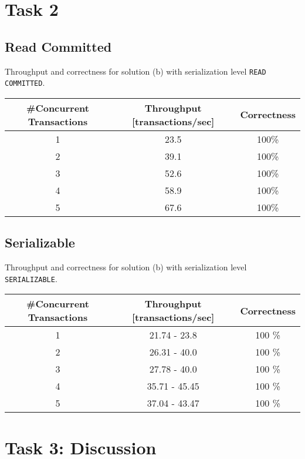 \documentclass[11pt]{scrartcl}
\begin{document}
\medskip

\section*{Task 2}

\subsection*{Read Committed}

Throughput and correctness for solution (b) with serialization level
{\tt\small READ COMMITTED}.

\bigskip

\begin{tabular}{c|c|c}
  \#Concurrent Transactions & Throughput [transactions/sec] & Correctness
  \\\hline
  1 & 23.5 & 100\% \\
  2 & 39.1 & 100\% \\
  3 & 52.6 & 100\% \\
  4 & 58.9 & 100\% \\
  5 & 67.6 & 100\% \\    
\end{tabular}

\medskip

\subsection*{Serializable}

Throughput and correctness for solution (b) with serialization level
{\tt\small SERIALIZABLE}.

\bigskip

\begin{tabular}{c|c|c}
  \#Concurrent Transactions & Throughput [transactions/sec] & Correctness
  \\\hline
  1 & 21.74 - 23.8 & 100 \% \\
  2 & 26.31 - 40.0 & 100 \%\\
  3 & 27.78 - 40.0 & 100 \%\\
  4 & 35.71 - 45.45 & 100 \%\\
  5 & 37.04 - 43.47 & 100 \%\\    
\end{tabular}

\medskip

\section*{Task 3: Discussion}
\end{document}
